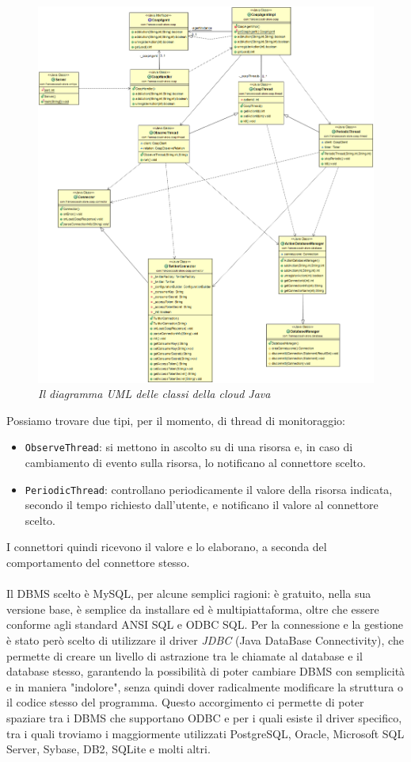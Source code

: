 \begin{figure}[hp]
\centering
\includegraphics[width=\textwidth]{immagini/uml.png}
\caption{\textit{Il diagramma UML delle classi della cloud Java}}
\end{figure}
\vspace{1.00cm}
Possiamo trovare due tipi, per il momento, di thread di monitoraggio:
\begin{itemize}
\item {\tt ObserveThread}: si mettono in ascolto su di una risorsa e, in caso di cambiamento di evento sulla risorsa, lo notificano al connettore scelto.
\item {\tt PeriodicThread}: controllano periodicamente il valore della risorsa indicata, secondo il tempo richiesto dall'utente, e notificano il valore al connettore scelto.
\end{itemize}
I connettori quindi ricevono il valore e lo elaborano, a seconda del comportamento del connettore stesso.
\\\\Il DBMS scelto è MySQL, per alcune semplici ragioni: è gratuito, nella sua versione base, è semplice da installare ed è multipiattaforma, oltre che essere conforme agli standard ANSI SQL e ODBC SQL. Per la connessione e la gestione è stato però scelto di utilizzare il driver \textit{JDBC} (Java DataBase Connectivity), che permette di creare un livello di astrazione tra le chiamate al database e il database stesso, garantendo la possibilità di poter cambiare DBMS con semplicità e in maniera "indolore", senza quindi dover radicalmente modificare la struttura o il codice stesso del programma. Questo accorgimento ci permette di poter spaziare tra i DBMS che supportano ODBC e per i quali esiste il driver specifico, tra i quali troviamo i maggiormente utilizzati PostgreSQL, Oracle, Microsoft SQL Server, Sybase, DB2, SQLite e molti altri.
